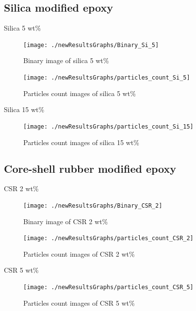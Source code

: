 \documentclass[numbers=noendperiod,chapterprefix=on]{icldt} %
\begin{document}
{\subsection{Silica modified epoxy}
Silica 5 wt\%

\begin{figure}[!hp]
\centering
\texttt{[image: ./newResultsGraphs/Binary\_Si\_5]}
\caption{Binary image of silica 5 wt\%} \label{Binary_Si_5}
\end{figure}
\FloatBarrier

\begin{figure}[!hp]
\centering
\texttt{[image: ./newResultsGraphs/particles\_count\_Si\_5]}
\caption{Particles count images of silica 5 wt\%} \label{particles_count_Si_5}
\end{figure}
\FloatBarrier

Silica 15 wt\%

\begin{figure}[!hp]
\centering
\texttt{[image: ./newResultsGraphs/particles\_count\_Si\_15]}
\caption{Particles count images of silica 15 wt\%} \label{particles_count_Si_15}
\end{figure}
\FloatBarrier
\newpage
\subsection{Core-shell rubber modified epoxy}
CSR 2 wt\%

\begin{figure}[!hp]
\centering
\texttt{[image: ./newResultsGraphs/Binary\_CSR\_2]}
\caption{Binary image of CSR 2 wt\%} \label{Binary_CSR_2}
\end{figure}
\FloatBarrier

\begin{figure}[!hp]
\centering
\texttt{[image: ./newResultsGraphs/particles\_count\_CSR\_2]}
\caption{Particles count images of CSR 2 wt\%} \label{particles_count_CSR_2}
\end{figure}
\FloatBarrier

\newpage
CSR 5 wt\%


\begin{figure}[!hp]
\centering
\texttt{[image: ./newResultsGraphs/particles\_count\_CSR\_5]}
\caption{Particles count images of CSR 5 wt\%} \label{particles_count_CSR_5}
\end{figure}
\FloatBarrier

}
\end{document}
